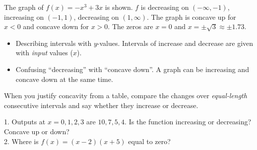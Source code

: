 \begin{example}
\begin{center}
\end{center}
The graph of $f(x)=-x^3+3x$ is shown. \sol $f$ is decreasing on $(-\infty,-1)$, increasing on $(-1,1)$, decreasing on $(1,\infty)$. The graph is concave up for $x<0$ and concave down for $x>0$. The zeros are $x=0$ and $x=\pm\sqrt3\approx\pm1.73$.
\end{example}

\begin{mistakes}
\begin{itemize}
\item Describing intervals with $y$-values. Intervals of increase and decrease are given with \emph{input} values ($x$).
\item Confusing ``decreasing'' with ``concave down''. A graph can be increasing and concave down at the same time.
\end{itemize}
\end{mistakes}

\begin{aptip}
When you justify concavity from a table, compare the changes over \emph{equal-length} consecutive intervals and say whether they increase or decrease.
\end{aptip}

\begin{quickcheck}
1. Outputs at $x=0,1,2,3$ are $10, 7, 5, 4$. Is the function increasing or decreasing? Concave up or down?\\
2. Where is $f(x)=(x-2)(x+5)$ equal to zero?
\end{quickcheck}


